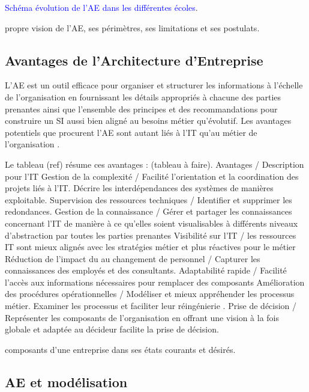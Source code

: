 \textcolor{blue}{Schéma évolution de l'AE dans les différentes écoles}.  



propre vision de l'AE, ses périmètres, ses limitations et ses postulats.

  
\subsection{Avantages de l'Architecture d'Entreprise}
L'AE est un outil efficace pour organiser et structurer les informations à 
l'échelle de l'organisation en fournissant les détails appropriés à chacune des 
parties prenantes ainsi que l'ensemble des principes et des recommandations pour 
construire un SI aussi bien aligné au besoins métier qu'évolutif. Les avantages 
potentiels que procurent l'AE sont autant liés à l'IT qu'au métier de 
l'organisation \cite{ross2005understanding}.

Le tableau (ref) résume ces avantages \cite{shah2007frameworks} : 
(tableau à faire). 
Avantages / Description
pour l'IT
Gestion de la complexité / Facilité l'orientation et la coordination des projets 
liés à l'IT. Décrire les interdépendances des systèmes de manières exploitable.
Supervision des ressources techniques / Identifier et supprimer les redondances.
Gestion de la connaissance /  Gérer et partager les connaissances concernant 
l'IT de manière à ce qu'elles soient visualisables à différents niveaux 
d'abstraction par toutes les parties prenantes 
Visibilité sur l'IT / les ressources IT sont mieux alignés avec les stratégies 
métier et plus réactives
pour le métier 
Réduction de l'impact du au changement de personnel / Capturer les connaissances 
des employés et des consultants. 
Adaptabilité rapide /  Facilité l'accès aux informations nécessaires pour 
remplacer des composants
Amélioration des procédures opérationnelles / Modéliser et mieux appréhender les 
processus métier. Examiner les processus et faciliter leur réingénierie  .
Prise de décision / Représenter les composants de l'organisation  en offrant une 
vision à la fois globale et adaptée au décideur facilite la prise de décision.




composants d'une entreprise dans ses états courants et désirés.  

\subsection{AE et modélisation}

